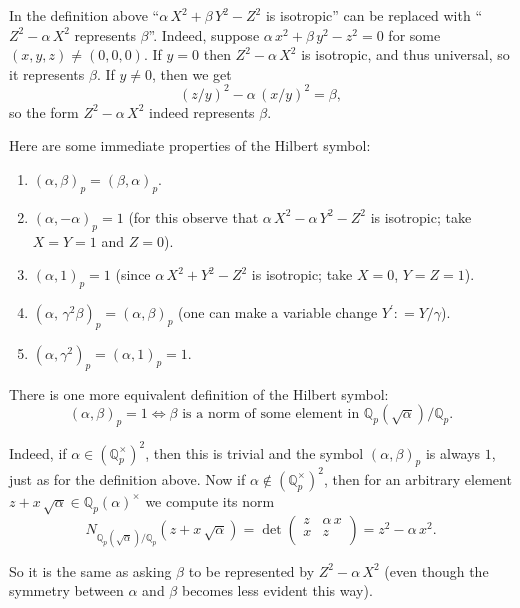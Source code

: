 \documentclass{article}
\newcommand{\dfn}{\mathrel{\mathop:}=}
\newcommand{\QQ}{\mathbb{Q}}
\theoremstyle{myplain}
\theoremstyle{mydefinition}
\begin{document}
In the definition above ``$\alpha\,X^2 + \beta\,Y^2 - Z^2$ is isotropic'' can be
replaced with ``$Z^2 - \alpha\,X^2$ represents $\beta$''. Indeed, suppose
$\alpha\,x^2 + \beta\,y^2 - z^2 = 0$ for some $(x,y,z) \ne (0,0,0)$. If $y = 0$
then $Z^2 - \alpha\,X^2$ is isotropic, and thus universal, so it represents
$\beta$. If $y \ne 0$, then we get
$$(z/y)^2 - \alpha\,(x/y)^2 = \beta,$$
so the form $Z^2 - \alpha\,X^2$ indeed represents $\beta$.

\vspace{1em}

Here are some immediate properties of the Hilbert symbol:
\begin{enumerate}
\item $(\alpha,\beta)_p = (\beta,\alpha)_p$.

\item $(\alpha,-\alpha)_p = 1$ (for this observe that
  $\alpha\,X^2 - \alpha\,Y^2 - Z^2$ is isotropic; take $X = Y = 1$ and $Z = 0$).

\item $(\alpha, 1)_p = 1$ (since $\alpha\,X^2 + Y^2 - Z^2$ is isotropic; take
  $X = 0$, $Y = Z = 1$).

\item $(\alpha, \, \gamma^2 \beta)_p = (\alpha, \beta)_p$ (one can make a
  variable change $Y^\prime \dfn Y/\gamma$).

\item $(\alpha, \gamma^2)_p = (\alpha, 1)_p = 1$.
\end{enumerate}

There is one more equivalent definition of the Hilbert symbol:
\[ (\alpha,\beta)_p = 1 \iff \beta \text{ is a norm of some element in } \QQ_p (\sqrt{\alpha})/\QQ_p. \]

Indeed, if $\alpha \in (\QQ_p^\times)^2$, then this is trivial and the symbol
$(\alpha,\beta)_p$ is always $1$, just as for the definition above. Now if
$\alpha \notin (\QQ_p^\times)^2$, then for an arbitrary element
$z + x\,\sqrt{\alpha} \in \QQ_p (\alpha)^\times$ we compute its norm
\[ N_{\QQ_p (\sqrt{\alpha})/\QQ_p} (z + x\,\sqrt{\alpha}) = \det \begin{pmatrix}
    z & \alpha\,x \\
    x & z \\
\end{pmatrix} = z^2 - \alpha\,x^2. \]

So it is the same as asking $\beta$ to be represented by $Z^2 - \alpha\,X^2$
(even though the symmetry between $\alpha$ and $\beta$ becomes less evident this
way).
\end{document}
